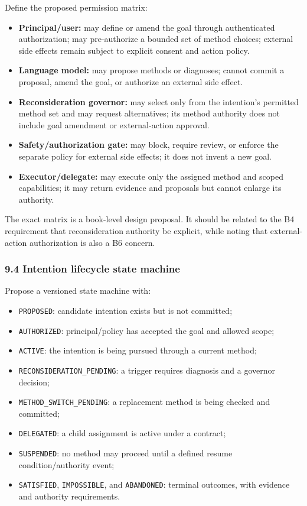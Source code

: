Define the proposed permission matrix:

\begin{itemize}
\tightlist
\item
  \textbf{Principal/user:} may define or amend the goal through authenticated authorization; may pre-authorize a bounded set of method choices; external side effects remain subject to explicit consent and action policy.
\item
  \textbf{Language model:} may propose methods or diagnoses; cannot commit a proposal, amend the goal, or authorize an external side effect.
\item
  \textbf{Reconsideration governor:} may select only from the intention's permitted method set and may request alternatives; its method authority does not include goal amendment or external-action approval.
\item
  \textbf{Safety/authorization gate:} may block, require review, or enforce the separate policy for external side effects; it does not invent a new goal.
\item
  \textbf{Executor/delegate:} may execute only the assigned method and scoped capabilities; it may return evidence and proposals but cannot enlarge its authority.
\end{itemize}

The exact matrix is a book-level design proposal. It should be related to the B4 requirement that reconsideration authority be explicit, while noting that external-action authorization is also a B6 concern.

\subsubsection{9.4 Intention lifecycle state machine}\label{intention-lifecycle-state-machine}

Propose a versioned state machine with:

\begin{itemize}
\tightlist
\item
  \texttt{PROPOSED}: candidate intention exists but is not committed;
\item
  \texttt{AUTHORIZED}: principal/policy has accepted the goal and allowed scope;
\item
  \texttt{ACTIVE}: the intention is being pursued through a current method;
\item
  \texttt{RECONSIDERATION\_PENDING}: a trigger requires diagnosis and a governor decision;
\item
  \texttt{METHOD\_SWITCH\_PENDING}: a replacement method is being checked and committed;
\item
  \texttt{DELEGATED}: a child assignment is active under a contract;
\item
  \texttt{SUSPENDED}: no method may proceed until a defined resume condition/authority event;
\item
  \texttt{SATISFIED}, \texttt{IMPOSSIBLE}, and \texttt{ABANDONED}: terminal outcomes, with evidence and authority requirements.
\end{itemize}

